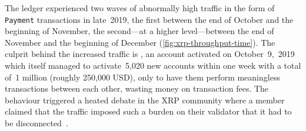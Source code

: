 The ledger experienced two waves of abnormally high traffic in the form of \texttt{Payment} transactions in late~2019, the first between the end of October and the beginning of November, the second---at a higher level---between the end of November and the beginning of December (\autoref{fig:xrp-throughput-time}). 
The culprit behind the increased traffic is , an account activated on October~9,~2019 which itself managed to activate~5,020 new accounts within one week with a total of~1 million  (roughly 250,000 USD), only to have them perform meaningless transactions between each other, wasting money on transaction fees. 
The behaviour triggered a heated debate in the XRP community where a member claimed that the traffic imposed such a burden on their validator that it had to be disconnected~\cite{Tulo2019}.




